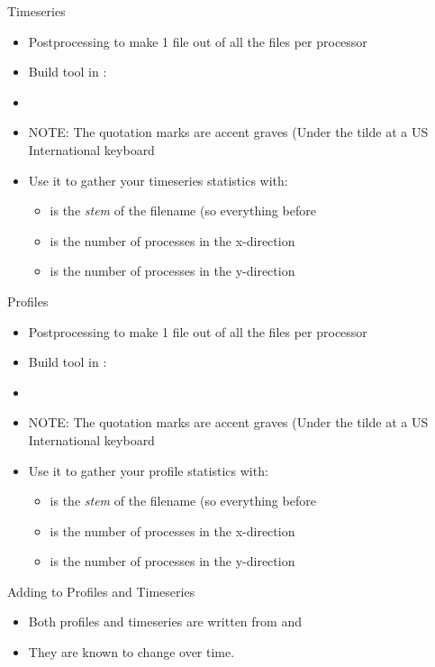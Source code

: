 \begin{frame}{Timeseries}
\begin{itemize}
 \item  Postprocessing to make 1 file out of all the files per processor
 \item Build tool in : 
 \item {}
 \item \alert{NOTE: The quotation marks are accent graves (Under the tilde at a US International keyboard}
  \item Use it to gather your timeseries statistics with:
\begin{itemize}
 \item {} is the \emph{stem} of the filename (so everything before 
 \item  {} is the number of processes in the x-direction
 \item {} is the number of processes in the y-direction
\end{itemize}
\end{itemize}
\end{frame}

\begin{frame}{Profiles}
\begin{itemize}
 \item  Postprocessing to make 1 file out of all the files per processor
 \item Build tool in : 
 \item {}
 \item \alert{NOTE: The quotation marks are accent graves (Under the tilde at a US International keyboard}
  \item Use it to gather your profile statistics with: 
\begin{itemize}
 \item {} is the \emph{stem} of the filename (so everything before 
 \item  {} is the number of processes in the x-direction
 \item {} is the number of processes in the y-direction
\end{itemize}
\end{itemize}
\end{frame}
\begin{frame}{Adding to Profiles and Timeseries}
 \begin{itemize}
  \item Both profiles and timeseries are written from  and 
  \item They are known to change over time. 
 \end{itemize}

\end{frame}

